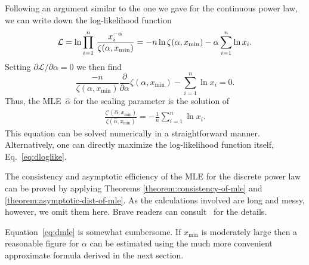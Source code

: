 \documentclass[final]{siamltex}
\newcommand{\xmin}{\ensuremath{x_{\min}}}
\newcommand{\Loglike}{\ensuremath{\mathcal{L}}}
\begin{document}
\begin{appendix}
Following an argument similar to the one we gave for the continuous power law,
we can write down the log-likelihood function
\begin{equation}
\label{eq:dloglike}
\Loglike = \ln \prod_{i=1}^{n} \, {x_{i}^{-\alpha}\over
          \zeta(\alpha,\xmin)}
        = - n \ln \zeta(\alpha,\xmin) -
          \alpha\sum_{i=1}^{n} \ln x_{i}.
\end{equation}
Setting $\partial\Loglike/\partial\alpha = 0$ we then find
\begin{equation}
\frac{-n}{\zeta(\alpha,\xmin)}
\frac{\partial}{\partial\alpha}\zeta(\alpha,\xmin)  -
\sum_{i=1}^{n} \ln x_{i} = 0.
\end{equation}
Thus, the MLE~$\hat{\alpha}$ for the scaling parameter is the solution of
\begin{align}
\label{eq:dmle}
\frac{\zeta'(\hat{\alpha},\xmin)}{\zeta(\hat{\alpha},\xmin)} =
 - \frac{1}{n}\sum_{i=1}^{n} \ln x_{i} .
\end{align}
This equation can be solved numerically in a straightforward manner.
Alternatively, one can directly maximize the log-likelihood function
itself, Eq.~\eqref{eq:dloglike}.

The consistency and asymptotic efficiency of the MLE for the discrete power
law can be proved by applying Theorems \ref{theorem:consistency-of-mle} and
\ref{theorem:asymptotic-dist-of-mle}.  As the calculations involved are
long and messy, however, we omit them here.  Brave readers can
consult~\cite{Arnold-on-Pareto-distributions} for the details.

Equation~\eqref{eq:dmle} is somewhat cumbersome.  If $\xmin$ is moderately
large then a reasonable figure for $\alpha$ can be estimated using the much
more convenient approximate formula derived in the next section.



\end{appendix}
\end{document}
